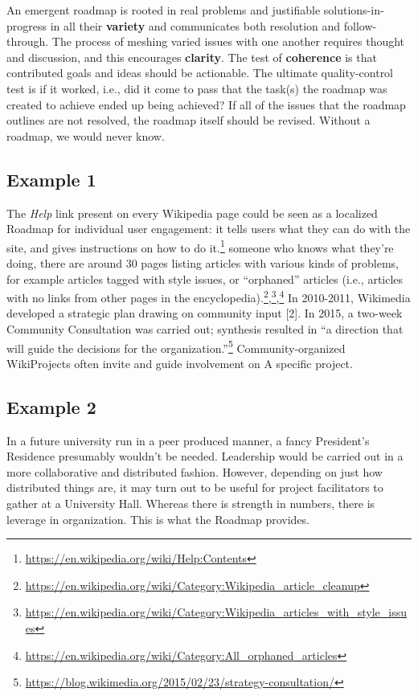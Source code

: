 An emergent roadmap is rooted in real problems and justifiable
solutions-in-progress in all their \textbf{variety} and communicates
both resolution and follow-through. The process of meshing varied issues
with one another requires thought and discussion, and this encourages
\textbf{clarity}. The test of \textbf{coherence} is that contributed
goals and ideas should be actionable. The ultimate quality-control test
is if it worked, i.e., did it come to pass that the task(s) the roadmap
was created to achieve ended up being achieved? If all of the issues
that the roadmap outlines are not resolved, the roadmap itself should be
revised. Without a roadmap, we would never know.

\hypertarget{example-1}{%
\subsection{Example 1}\label{example-1}}

The \emph{Help} link present on every Wikipedia page could be seen as a
localized {{Roadmap}} for individual user engagement: it tells users
what they can do with the site, and gives instructions on how to do
it.\footnote{\url{https://en.wikipedia.org/wiki/Help:Contents}} someone
who knows what they're doing, there are around 30 pages listing articles
with various kinds of problems, for example articles tagged with style
issues, or ``orphaned'' articles (i.e., articles with no links from
other pages in the encyclopedia).\footnote{\url{https://en.wikipedia.org/wiki/Category:Wikipedia_article_cleanup}},\footnote{\url{https://en.wikipedia.org/wiki/Category:Wikipedia_articles_with_style_issues}},\footnote{\url{https://en.wikipedia.org/wiki/Category:All_orphaned_articles}}
In 2010-2011, Wikimedia developed a strategic plan drawing on community
input {{[}2{]}}. In 2015, a two-week Community Consultation was carried
out; synthesis resulted in ``a direction that will guide the decisions
for the organization.''\footnote{\url{https://blog.wikimedia.org/2015/02/23/strategy-consultation/}}
Community-organized WikiProjects often invite and guide involvement on
{{A specific project}}.

\hypertarget{example-2}{%
\subsection{Example 2}\label{example-2}}

In a future university run in a peer produced manner, a fancy
President's Residence presumably wouldn't be needed. Leadership would be
carried out in a more collaborative and distributed fashion. However,
depending on just how distributed things are, it may turn out to be
useful for project facilitators to gather at a University Hall. Whereas
there is strength in numbers, there is leverage in organization. This is
what the {{Roadmap}} provides.

